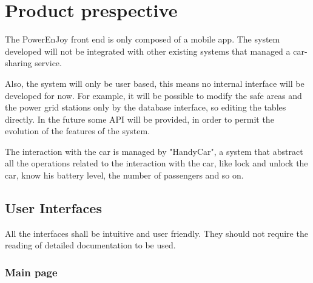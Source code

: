 \section{Product prespective}

The PowerEnJoy front end is only composed of a mobile app.
The system developed will not be integrated with other existing systems that managed a car-sharing service.

Also, the system will only be user based, this means no internal interface will be developed for now.
For example, it will be possible to modify the safe areas and the power grid stations only by the database interface, so editing the tables directly.
In the future some API will be provided, in order to permit the evolution of the features of the system.

The interaction with the car is managed by "HandyCar", a system that abstract all the operations related to the interaction with the car, like lock and unlock the car, know his battery level, the number of passengers and so on.


\subsection{User Interfaces}
All the interfaces shall be intuitive and user friendly. They should not
require the reading of detailed documentation to be used.

\subsubsection*{Main page}

